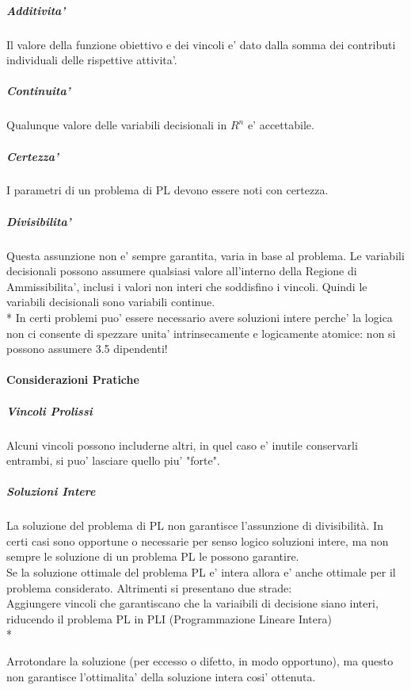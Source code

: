 \subparagraph{Additivita'}
Il valore della funzione obiettivo e dei vincoli e' dato dalla somma dei contributi individuali delle rispettive attivita'.

\subparagraph{Continuita'}
Qualunque valore delle variabili decisionali in $R^n$ e' accettabile.

\subparagraph{Certezza'}
I parametri di un problema di PL devono essere noti con certezza.

\subparagraph{Divisibilita'}
Questa assunzione non e' sempre garantita, varia in base al problema.
Le variabili decisionali possono assumere qualsiasi valore all'interno della Regione di Ammissibilita', inclusi i valori non interi che soddisfino i vincoli. Quindi le variabili decisionali sono variabili continue. \\*
In certi problemi puo' essere necessario avere soluzioni intere perche' la logica non ci consente di spezzare unita' intrinsecamente e logicamente atomice: non si possono assumere 3.5 dipendenti!

\paragraph{Considerazioni Pratiche}

\subparagraph{Vincoli Prolissi}
Alcuni vincoli possono includerne altri, in quel caso e' inutile conservarli entrambi, si puo' lasciare quello piu' "forte".

\subparagraph{Soluzioni Intere}
La soluzione del problema di PL non garantisce l’assunzione di divisibilità.
In certi casi sono opportune o necessarie per senso logico soluzioni intere, ma non sempre le soluzione di un problema PL le possono garantire. \\

Se la soluzione ottimale del problema PL e' intera allora e' anche ottimale per il problema considerato. Altrimenti si presentano due strade: \\

Aggiungere vincoli che garantiscano che la variaibili di decisione siano interi, riducendo il problema PL in PLI (Programmazione Lineare Intera) \\*

Arrotondare la soluzione (per eccesso o difetto, in modo opportuno), ma questo non garantisce l'ottimalita' della soluzione intera cosi' ottenuta.
